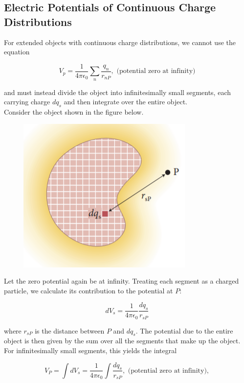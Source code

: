     \subsection{Electric Potentials of Continuous Charge Distributions}   %

        For extended objects with continuous charge distributions, we cannot use the equation

        \[
            V_p = \frac{1}{4\pi\epsilon_0} \sum_n \frac{q_n}{r_{nP}}, \text{ (potential zero at infinity)}
        \]

        and must instead divide the object into infinitesimally small segments, each carrying charge $dq_s$ and then integrate over the entire object. \\

        Consider the object shown in the figure below.

        \begin{figure}[hbt!]
            \centering
            \includegraphics[scale = 0.75]{Resources/25.6_Figure}
        \end{figure}

        Let the zero potential again be at infinity. Treating each segment as a charged particle, we calculate its contribution to the potential at $P$:

        \[
            dV_s = \frac{1}{4\pi\epsilon_0} \frac{dq_s}{r_{sP}}
        \]

        where $r_{sP}$ is the distance between $P$ and $dq_s$. The potential due to the entire object is then given by the sum over all the segments that make up the object. For infinitesimally small segments, this
        yields the integral

        \[
            V_P = \int dV_s = \frac{1}{4\pi\epsilon_0} \int \frac{dq_s}{r_{sP}}, \text{ (potential zero at infinity)},
        \]

